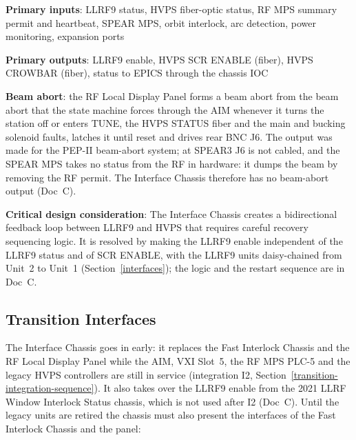 \textbf{Primary inputs}: LLRF9 status, HVPS fiber-optic status, RF MPS summary permit and heartbeat, SPEAR MPS, orbit interlock, arc detection, power monitoring, expansion ports

\textbf{Primary outputs}: LLRF9 enable, HVPS SCR ENABLE (fiber), HVPS CROWBAR (fiber), status to EPICS through the chassis IOC

\textbf{Beam abort}: the RF Local Display Panel forms a beam abort from the beam abort that the state machine forces through the AIM whenever it turns the station off or enters TUNE, the HVPS STATUS fiber and the main and bucking solenoid faults, latches it until reset and drives rear BNC J6. The output was made for the PEP-II beam-abort system; at SPEAR3 J6 is not cabled, and the SPEAR MPS takes no status from the RF in hardware: it dumps the beam by removing the RF permit. The Interface Chassis therefore has no beam-abort output (Doc~C).

\textbf{Critical design consideration}: The Interface Chassis creates a bidirectional feedback loop between LLRF9 and HVPS that requires careful recovery sequencing logic. It is resolved by making the LLRF9 enable independent of the LLRF9 status and of SCR ENABLE, with the LLRF9 units daisy-chained from Unit~2 to Unit~1 (Section~\ref{interfaces}); the logic and the restart sequence are in Doc~C.

\subsection{Transition Interfaces}\label{ic-transition-interfaces}

The Interface Chassis goes in early: it replaces the Fast Interlock Chassis and the RF Local Display Panel while the AIM, VXI Slot~5, the RF MPS PLC-5 and the legacy HVPS controllers are still in service (integration I2, Section~\ref{transition-integration-sequence}). It also takes over the LLRF9 enable from the 2021 LLRF Window Interlock Status chassis, which is not used after I2 (Doc~C). Until the legacy units are retired the chassis must also present the interfaces of the Fast Interlock Chassis and the panel:

